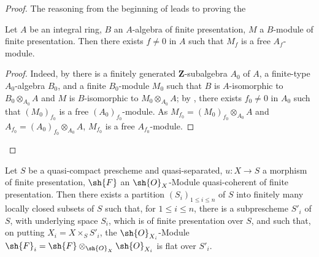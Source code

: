 \begin{proof}
The reasoning from the beginning of  leads to proving the

\begin{lemma}[8.9.4.1]
\label{IV.8.9.4.1}
Let $A$ be an integral ring, $B$ an $A$-algebra of finite presentation, $M$ a $B$-module of finite presentation.
Then there exists $f\neq 0$ in $A$ such that $M_f$ is a free $A_f$-module.
\end{lemma}

\begin{proof}
Indeed, by  there is a finitely generated $\mathbf{Z}$-subalgebra $A_0$ of $A$, a finite-type $A_0$-algebra $B_0$, and a finite $B_0$-module $M_0$ such that $B$ is $A$-isomorphic to $B_0\otimes_{A_0}A$ and $M$ is $B$-isomorphic to $M_0\otimes_{A_0}A$; by , there exists $f_0\neq 0$ in $A_0$ such that $(M_0)_{f_0}$ is a free $(A_0)_{f_0}$-module.
As $M_{f_0}=(M_0)_{f_0}\otimes_{A_0}A$ and $A_{f_0}=(A_0)_{f_0}\otimes_{A_0}A$, $M_{f_0}$ is a free $A_{f_0}$-module.
\end{proof}
\end{proof}

\begin{corollary}[8.9.5]
\label{IV.8.9.5}
Let $S$ be a quasi-compact prescheme and quasi-separated, $u:X\to S$ a morphism of finite presentation, $\sh{F}$ an $\sh{O}_X$-Module quasi-coherent of finite presentation.
Then there exists a partition $(S_i)_{1\leqslant i\leqslant n}$ of $S$ into finitely many locally closed subsets of $S$ such that, for $1\leqslant i\leqslant n$, there is a subprescheme $S'_i$ of $S$, with underlying space $S_i$, which is of finite presentation over $S$, and such that, on putting $X_i=X\times_S S'_i$, the $\sh{O}_{X_i}$-Module $\sh{F}_i=\sh{F}\otimes_{\sh{O}_X}\sh{O}_{X_i}$ is flat over $S'_i$.
\end{corollary}

